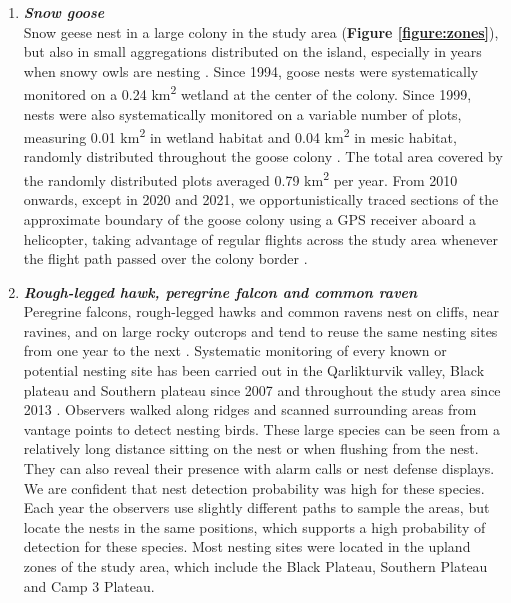 \documentclass[a4paper,twoside,12pt]{article}
\begin{document}
\begin{enumerate}[label=\roman*]
        \item[] \textit{\textbf{Snow goose}}\\
        Snow geese nest in a large colony in the study area (\textbf{Figure \ref{figure:zones}}), but also in small aggregations distributed on the island, especially in years when snowy owls are nesting \citep{lepage1996,reed2002}. Since 1994, goose nests were systematically monitored on a 0.24 km\textsuperscript{2} wetland at the center of the colony. Since 1999, nests were also systematically monitored on a variable number of plots, measuring 0.01 km\textsuperscript{2} in wetland habitat and 0.04 km\textsuperscript{2} in mesic habitat, randomly distributed throughout the goose colony \citep{gauthier2020goose}. The total area covered by the randomly distributed plots averaged 0.79  km\textsuperscript{2} per year. From 2010 onwards, except in 2020 and 2021, we opportunistically traced sections of the approximate boundary of the goose colony using a GPS receiver aboard a helicopter, taking advantage of regular flights across the study area whenever the flight path passed over the colony border \citep{duchesne2021}.
        
        \item[] \textit{\textbf{Rough-legged hawk, peregrine falcon and common raven}}\\
        Peregrine falcons, rough-legged hawks and common ravens nest on cliffs, near ravines, and on large rocky outcrops and tend to reuse the same nesting sites from one year to the next \citep{beardsell2016}. Systematic monitoring of every known or potential nesting site has been carried out in the Qarlikturvik valley, Black plateau and Southern plateau since 2007 and throughout the study area since 2013 \citep{beardsell2016, gauthier2020avianpred}. Observers walked along ridges and scanned surrounding areas from vantage points to detect nesting birds. These large species can be seen from a relatively long distance sitting on the nest or when flushing from the nest. They can also reveal their presence with alarm calls or nest defense displays. We are confident that nest detection probability was high for these species. Each year the observers use slightly different paths to sample the areas, but locate the nests in the same positions, which supports a high probability of detection for these species. Most nesting sites were located in the upland zones of the study area, which include the Black Plateau, Southern Plateau and Camp 3 Plateau.
        

\end{enumerate}
\end{document}
